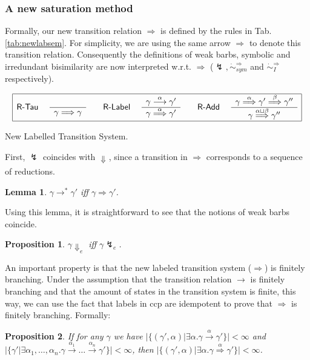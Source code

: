 \documentclass[copyright,creativecommons]{eptcs}
\newcommand{\rrarrow}{\longrightarrow}
\newcommand{\trans}[1]{\stackrel{#1}{\rrarrow}}
\newcommand{\wbarb}[1]{\Downarrow_{#1}}
\newcommand{\bigfrac}[2]{
\begin{array}{c}#1\\
\hline #2
\end{array}}
\newtheorem{proposition}{Proposition}
\newtheorem{lemma}{Lemma}
\newcommand{\newtrans}[1]{\stackrel{#1}{\Longrightarrow}}
\newcommand{\reds}{\rrarrow^*}
\newcommand{\genbarb}[1]{\lightning_{#1}}
\newcommand{\A}{\alpha}
\newcommand{\B}{\beta}
\newcommand{\G}{\gamma}
\newcommand{\lub}{\sqcup}
\newcommand{\rTau}{{\sf R-Tau} }
\newcommand{\rLabel}{{\sf R-Label} }
\newcommand{\rAdd}{{\sf R-Add} }
\newcommand{\newirrbis}{\dot{\sim}^{\newtrans{}}_{I}}
\newcommand{\newsymbis}{\dot{\sim}^{\newtrans{}}_{sym}}
\begin{document}
\subsubsection{A new saturation method} \label{sssec:defNewLTS}
Formally, our new transition relation $\newtrans{}$ is defined by the rules in Tab. \ref{tab:newlabsem}.
For simplicity, we are using the same arrow $\newtrans{}$ to denote this transition relation.
Consequently the definitions of weak barbs, symbolic and irredundant bisimilarity
are now interpreted w.r.t. $\newtrans{}$ ($\genbarb{}, \newsymbis$ and $\newirrbis$ respectively).
\begin{table}[tb]
\small
\[\begin{array}{|c|}
\hline
\makebox{\rTau} \quad \bigfrac{}{\G \newtrans{} \G} \qquad
\makebox{\rLabel} \quad \bigfrac{\G \trans{\A} \G'}{\G \newtrans{\A} \G'} \qquad
\makebox{\rAdd} \quad \bigfrac{\G \newtrans{\A} \G' \newtrans{\B} \G''}
{\G \newtrans{\A \lub \B} \G''} \\
\hline
\end{array}\]
\caption{New Labelled Transition System.}\label{tab:newlabsem}
\end{table}

First, $\genbarb{}$ coincides with $\wbarb{}$, since
a transition in $\newtrans{}$ corresponds to a sequence of reductions.
\begin{lemma}
\label{lem:redsToNewTrans}
$\G \reds \G'$ iff $\G \newtrans{} \G'$.
\end{lemma}

Using this lemma, it is straightforward to see that the notions of weak barbs coincide.
\begin{proposition}
\label{prop:weakBarbs}
$\G \wbarb{e}$ iff $\G \genbarb{e}$.
\end{proposition}

An important property is that the new labeled transition system ($\newtrans{}$) is finitely branching.
Under the assumption that the transition relation $\trans{}$ is finitely branching and that the amount of states
in the transition system is finite,
this way, we can use the fact that labels in ccp are idempotent to prove that $\newtrans{}$ is finitely branching.
Formally:

\begin{proposition}
\label{prop:finBranch}
If for any $\G$ we have $|\{ (\G', \A) | \exists \A. \G \trans{\A} \G'\}| < \infty$ and
$|\{ \G' | \exists \A_1, \dots, \A_n. \G \trans{\A_1} \dots \trans{\A_n} \G'\}| < \infty$,
then $|\{ (\G', \A) | \exists \A. \G \newtrans{\A} \G'\}| < \infty$.

\end{proposition}
\end{document}
